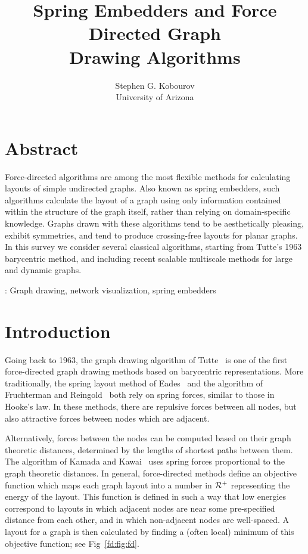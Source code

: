 \documentclass[notitlepage,letter,11pt]{article}
\title{Spring Embedders and Force Directed Graph\\ Drawing Algorithms}
\author{Stephen G. Kobourov\\University of Arizona}
\begin{document}
\maketitle



\section*{Abstract}
Force-directed algorithms are among the most flexible methods for calculating layouts of simple undirected graphs. Also known as spring embedders, such algorithms calculate
the layout of a graph using only information contained within the
structure of the graph itself, rather than relying on domain-specific
knowledge.  Graphs drawn with these algorithms tend to be
aesthetically pleasing, exhibit symmetries, and tend to produce
crossing-free layouts for planar graphs. In this survey we consider several classical algorithms, starting from Tutte's 1963 barycentric method, and including recent scalable multiscale methods for large and dynamic graphs. 


\bigskip
{}: Graph drawing, network visualization, spring embedders


\section{Introduction}
\label{fd:sec:intro}







Going back to 1963, the graph drawing algorithm of
Tutte~\cite{t-hdg-63} is one of the first force-directed graph drawing
methods based on barycentric representations.  More traditionally, the
spring layout method of Eades~\cite{Eades+1984a} and the algorithm of
Fruchterman and Reingold~\cite{fr-gdfdp-91} both rely on spring
forces, similar to those in Hooke's law. In these methods, there are
repulsive forces between all nodes, but also attractive forces between
nodes which are adjacent.  

Alternatively, forces between the nodes can be computed based on their
graph theoretic distances, determined by the lengths of shortest paths
between them. The algorithm of Kamada and Kawai~\cite{kk-adgug-89}
uses spring forces proportional to the graph theoretic distances. In
general, force-directed methods define an objective function which
maps each graph layout into a number in $\cal{R}^{+}$ representing the
energy of the layout.  This function is defined in such a way that low
energies correspond to layouts in which adjacent nodes are near some
pre-specified distance from each other, and in which non-adjacent
nodes are well-spaced.  A layout for a graph is then calculated by
finding a (often local) minimum of this objective function; see
Fig~\ref{fd:fig:fd}.
\end{document}
